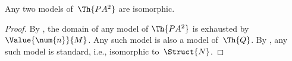 \documentclass[../../../include/open-logic-section]{subfiles}
\begin{document}
\begin{cor}
Any two models of~$\Th{PA^2}$ are isomorphic.
\end{cor}

\begin{proof}
By , the domain of any model of $\Th{PA^2}$
is exhausted by $\Value{\num{n}}{M}$. Any such model is also a model
of~$\Th{Q}$. By , any such
model is standard, i.e., isomorphic to~$\Struct{N}$.
\end{proof}
\end{document}
